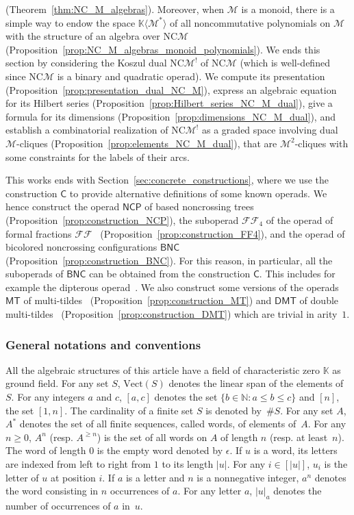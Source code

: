 \documentclass[10pt,reqno]{amsart}
\numberwithin{equation}{subsection}
\renewcommand{\leq}{\leqslant}
\renewcommand{\geq}{\geqslant}
\newcommand{\N}{\mathbb{N}}
\newcommand{\K}{\mathbb{K}}
\newcommand{\Mca}{\mathcal{M}}
\newcommand{\BNC}{\mathsf{BNC}}
\newcommand{\Cli}{\mathsf{C}}
\newcommand{\NCP}{\mathsf{NCP}}
\newcommand{\MT}{\mathsf{MT}}
\newcommand{\DMT}{\mathsf{DMT}}
\newcommand{\NC}{\mathrm{NC}}
\newcommand{\FF}{\mathcal{F}\mathcal{F}}
\newcommand{\Vect}{\mathrm{Vect}}
\begin{document}
(Theorem~\ref{thm:NC_M_algebras}). Moreover, when $\Mca$ is a monoid,
there is a simple way to endow the space $\K \langle \Mca^* \rangle$ of
all noncommutative polynomials on $\Mca$ with the structure of an
algebra over $\NC\Mca$
(Proposition~\ref{prop:NC_M_algebras_monoid_polynomials}). We ends this
section by considering the Koszul dual $\NC\Mca^!$ of $\NC\Mca$ (which
is well-defined since $\NC\Mca$ is a binary and quadratic operad). We
compute its presentation
(Proposition~\ref{prop:presentation_dual_NC_M}), express an algebraic
equation for its Hilbert series
(Proposition~\ref{prop:Hilbert_series_NC_M_dual}), give a formula for
its dimensions (Proposition~\ref{prop:dimensions_NC_M_dual}), and
establish a combinatorial realization of $\NC\Mca^!$ as a graded space
involving dual $\Mca$-cliques
(Proposition~\ref{prop:elements_NC_M_dual}), that are $\Mca^2$-cliques
with some constraints for the labels of their arcs.
\smallskip

This works ends with Section~\ref{sec:concrete_constructions}, where we
use the construction $\Cli$ to provide alternative definitions of some
known operads. We hence construct the operad $\NCP$ of based noncrossing
trees~\cite{Cha07,Ler11} (Proposition~\ref{prop:construction_NCP}), the
suboperad $\FF_4$ of the operad of formal fractions $\FF$~\cite{CHN16}
(Proposition~\ref{prop:construction_FF4}), and the operad of bicolored
noncrossing configurations $\BNC$~\cite{CG14}
(Proposition~\ref{prop:construction_BNC}). For this reason,
in particular, all the suboperads of $\BNC$ can be obtained from the
construction $\Cli$. This includes for example the dipterous
operad~\cite{LR03,Zin12}. We also construct some versions of the operads
$\MT$ of multi-tildes~\cite{CCM11,LMN13}
(Proposition~\ref{prop:construction_MT}) and $\DMT$ of double
multi-tildes~\cite{GLMN16} (Proposition~\ref{prop:construction_DMT})
which are trivial in arity~$1$.
\medskip

\subsubsection*{General notations and conventions}
All the algebraic structures of this article have a field of
characteristic zero $\K$ as ground field. For any set $S$, $\Vect(S)$
denotes the linear span of the elements of $S$. For any integers $a$ and
$c$, $[a, c]$ denotes the set $\{b \in \N : a \leq b \leq c\}$ and $[n]$,
the set $[1, n]$. The cardinality of a finite set $S$ is denoted
by~$\# S$. For any set $A$, $A^*$ denotes the set of all finite
sequences, called words, of elements of~$A$. For any $n \geq 0$, $A^n$
(resp. $A^{\geq n}$) is the set of all words on $A$ of length $n$ (resp.
at least~$n$). The word of length $0$ is the empty word denoted by
$\epsilon$. If $u$ is a word, its letters are indexed from left to right
from $1$ to its length $|u|$. For any $i \in [|u|]$, $u_i$ is the letter
of $u$ at position $i$. If $a$ is a letter and $n$ is a nonnegative
integer, $a^n$ denotes the word consisting in $n$ occurrences of $a$.
For any letter $a$, $|u|_a$ denotes the number of occurrences of $a$
in~$u$.
\medskip
\end{document}
